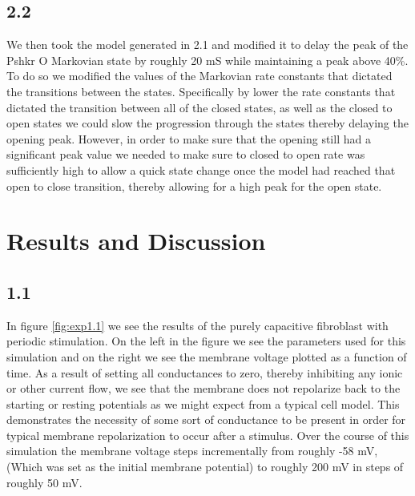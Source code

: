 \documentclass[11pt]{article}
\begin{document}
\subsection{2.2}
\par{}
We then took the model generated in 2.1 and modified it to delay the peak of the Pshkr O Markovian state by roughly 20 mS while maintaining a peak above 40\%. To do so we modified the values of the Markovian rate constants that dictated the transitions between the states. Specifically by lower the rate constants that dictated the transition between all of the closed states, as well as the closed to open states we could slow the progression through the states thereby delaying the opening peak. However, in order to make sure that the opening still had a significant peak value we needed to make sure to closed to open rate was sufficiently high to allow a quick state change once the model had reached that open to close transition, thereby allowing for a high peak for the open state.

\section{Results and Discussion}




\subsection{1.1}
\par{}
In figure \ref{fig:exp1.1} we see the results of the purely capacitive fibroblast with periodic stimulation. On the left in the figure we see the parameters used for this simulation and on the right we see the membrane voltage plotted as a function of time. As a result of setting all conductances to zero, thereby inhibiting any ionic or other current flow, we see that the membrane does not repolarize back to the starting or resting potentials as we might expect from a typical cell model. This demonstrates the necessity of some sort of conductance to be present in order for typical membrane repolarization to occur after a stimulus. Over the course of this simulation the membrane voltage steps incrementally from roughly -58 mV, (Which was set as the initial membrane potential) to roughly 200 mV in steps of roughly 50 mV. 
\end{document}
